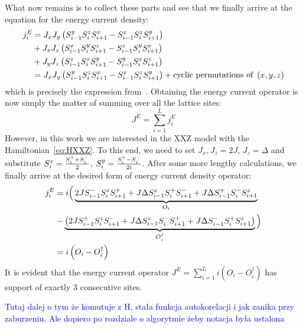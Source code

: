 What now remains is to collect these parts and see that we finally arrive at the equation for the energy current density:
\begin{align}
    j_i^E &= J_x J_y \left(S^{y}_{i-1}S^{z}_i S^{x}_{i+1} - S^{x}_{i-1}S^{z}_{i}S^{y}_{i+1}\right) \nonumber\\
    &+ J_x J_z \left(S^{x}_{i-1}S^{y}_i S^{z}_{i+1} - S^{z}_{i-1}S^{y}_{i}S^{x}_{i+1}\right) \nonumber \\
    &+ J_y J_z \left(S^{z}_{i-1}S^{x}_i S^{y}_{i+1} - S^{y}_{i-1}S^{x}_{i}S^{z}_{i+1}\right) \nonumber \\
    &= J_x J_y \left(S^{y}_{i-1}S^{z}_i S^{x}_{i+1} - S^{x}_{i-1}S^{z}_{i}S^{y}_{i+1}\right) + \text{cyclic permutations of } \left(x,y,z\right)
    \label{eq:energy current density}
\end{align}
which is precisely the expression from~\textcite{Zotos1997}. Obtaining the energy current operator is now simply the matter of summing over all the lattice sites:
\begin{equation}
    J^E = \sum_{i=1}^L j_i^E
    \label{eq:energy current}
\end{equation}
However, in this work we are interested in the XXZ model with the Hamiltonian~\eqref{eq:HXXZ}. To this end,
we need to set \(J_x, J_z = 2J\), \(J_z = \Delta\) and substitute \(S^{x}_i = \frac{S^{+}_i + S^{-}_i}{2}\), \(S^{y}_i = \frac{S^{+}_i-S^{-}_i}{2i}\).
After some more lengthy calculations, we finally arrive at the desired form of energy current density operator:
\begin{align}
    j_i^E &= i \Big( \underbrace{2J S^{-}_{i-1}S^{z}_i S^{+}_{i+1} + J \Delta S^{z}_{i-1}S^{+}_i S^{-}_{i+1} + J\Delta S^{+}_{i-1}S^{-}_iS^{z}_{i+1}}_{O_i} \\
    &- \underbrace{\left(2J S^{+}_{i-1}S^{z}_i S^{-}_{i+1} + J\Delta S^{z}_{i-1}S^{-}_i S^{+}_{i+1} + J\Delta S^{-}_{i-1}S^{+}_{i} S^{z}_{i+1} \right)}_{O_i^{\dagger}}\Big) \nonumber \\
    &= i\left(O_i - O_i^{\dagger}\right)
    \label{eq:final energy current density}
\end{align}
It is evident that the energy current operator \(J^E = \sum_{i=1}^L i \left(O_i - O_i^{\dagger}\right) \) has support of exactly \(3\) consecutive sites.


\textcolor{blue}{Tutaj dalej o tym że komutuje z H, stała funkcja autokorelacji i jak zanika przy zaburzeniu. Ale dopiero po rozdziale o algorytmie żeby notacja była ustalona}